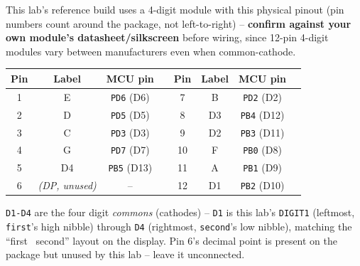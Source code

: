 \documentclass[11pt]{article}
\begin{document}
\begin{summary}
This lab's reference build uses a 4-digit module with this physical pinout (pin
numbers count around the package, not left-to-right) -- \textbf{confirm against
your own module's datasheet/silkscreen} before wiring, since 12-pin 4-digit
modules vary between manufacturers even when common-cathode.
\begin{center}
\begin{tabular}{@{}cccc|cccc@{}}
\toprule
\textbf{Pin} & \textbf{Label} & \textbf{MCU pin} & & \textbf{Pin} & \textbf{Label} & \textbf{MCU pin} & \\
\midrule
1 & E & \texttt{PD6} (D6) & & 7 & B & \texttt{PD2} (D2) & \\
2 & D & \texttt{PD5} (D5) & & 8 & D3 & \texttt{PB4} (D12) & \\
3 & C & \texttt{PD3} (D3) & & 9 & D2 & \texttt{PB3} (D11) & \\
4 & G & \texttt{PD7} (D7) & & 10 & F & \texttt{PB0} (D8) & \\
5 & D4 & \texttt{PB5} (D13) & & 11 & A & \texttt{PB1} (D9) & \\
6 & \emph{(DP, unused)} & -- & & 12 & D1 & \texttt{PB2} (D10) & \\
\bottomrule
\end{tabular}
\end{center}
\texttt{D1-D4} are the four digit \emph{commons} (cathodes) -- \texttt{D1} is
this lab's \texttt{DIGIT1} (leftmost, \texttt{first}'s high nibble) through
\texttt{D4} (rightmost, \texttt{second}'s low nibble), matching the ``first \textbar\
second'' layout on the display. Pin 6's decimal point is present on the package
but unused by this lab -- leave it unconnected.
\end{summary}
\end{document}
